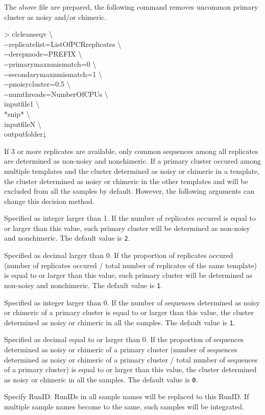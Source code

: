 \documentclass[titlepage,10pt,a4paper,english]{jsbook}
\newenvironment{cmd}{\begin{oframed}\raggedright\ttfamily\footnotesize\setlength{\baselineskip}{1.4em}}{\end{oframed}\vspace{-1em}}
\begin{document}
The above file are prepared, the following command removes uncommon primary cluster as noisy and/or chimeric.
\begin{cmd}
{\textgreater} clcleanseqv {\textbackslash}\\
{-}{-}replicatelist=ListOfPCRreplicates {\textbackslash}\\
{-}{-}derepmode=PREFIX {\textbackslash}\\
{-}{-}primarymaxnmismatch=0 {\textbackslash}\\
{-}{-}secondarymaxnmismatch=1 {\textbackslash}\\
{-}{-}pnoisycluster=0.5 {\textbackslash}\\
{-}{-}numthreads=NumberOfCPUs {\textbackslash}\\
inputfile1 {\textbackslash}\\
*snip* {\textbackslash}\\
inputfileN {\textbackslash}\\
outputfolder↓
\end{cmd}
If 3 or more replicates are available, only common sequences among all replicates are determined as non-noisy and nonchimeric.
If a primary cluster occured among multiple templates and the cluster determined as noisy or chimeric in a template, the cluster determined as noisy or chimeric in the other templates and will be excluded from all the samples by default.
However, the following arguments can change this decision method.
\begin{description}\small\setlength{\baselineskip}{1.1em}
\item[\texttt{{-}{-}minnreplicate}] Specified as integer larger than 1.
If the number of replicates occured is equal to or larger than this value, such primary cluster will be determined as non-noisy and nonchimeric.
The default value is \texttt{2}.
\item[\texttt{{-}{-}minpreplicate}] Specified as decimal larger than 0.
If the proportion of replicates occured (number of replicates occured / total number of replicates of the same template) is equal to or larger than this value, such primary cluster will be determined as non-noisy and nonchimeric.
The default value is \texttt{1}.
\item[\texttt{{-}{-}minnpositive}] Specified as integer larger than 0.
If the number of sequences determined as noisy or chimeric of a primary cluster is equal to or larger than this value, the cluster determined as noisy or chimeric in all the samples.
The default value is \texttt{1}.
\item[\texttt{{-}{-}minppositive}] Specified as decimal equal to or larger than 0.
If the proportion of sequences determined as noisy or chimeric of a primary cluster (number of sequences determined as noisy or chimeric of a primary cluster / total number of sequences of a primary cluster) is equal to or larger than this value, the cluster determined as noisy or chimeric in all the samples.
The default value is \texttt{0}.
\item[\texttt{{-}{-}runname}] Specify RunID.
RunIDs in all sample names will be replaced to this RunID.
If multiple sample names become to the same, such samples will be integrated.
\end{description}
\end{document}
